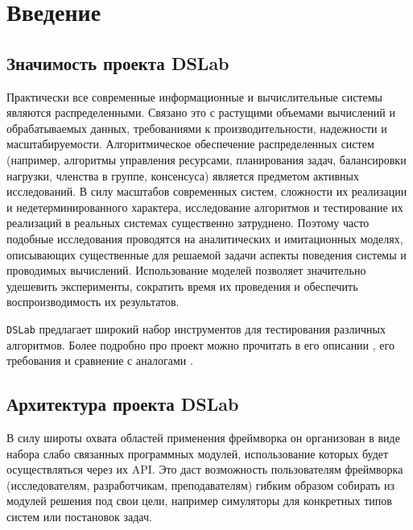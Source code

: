 \newpage

\section{Введение}

\subsection{Значимость проекта DSLab}

Практически все современные информационные и вычислительные системы являются распределенными. Связано это с растущими объемами вычислений и обрабатываемых данных, требованиями к производительности, надежности и масштабируемости. Алгоритмическое обеспечение распределенных систем (например, алгоритмы управления ресурсами, планирования задач, балансировки нагрузки, членства в группе, консенсуса) является предметом активных исследований. В силу масштабов современных систем, сложности их реализации и недетерминированного характера, исследование алгоритмов и тестирование их реализаций в реальных системах существенно затруднено. Поэтому часто подобные исследования проводятся на аналитических и имитационных моделях, описывающих существенные для решаемой задачи аспекты поведения системы и проводимых вычислений. Использование моделей позволяет значительно удешевить эксперименты, сократить время их проведения и обеспечить воспроизводимость их результатов.

\texttt{DSLab}\cite{dslab-repo} предлагает широкий набор инструментов для тестирования различных алгоритмов. Более подробно про проект можно прочитать в его описании \cite{dslab-description}, его требования \cite{dslab-requirements} и сравнение с аналогами \cite{dslab-analog-cmp}.

\subsection{Архитектура проекта DSLab}

В силу широты охвата областей применения фреймворка он организован в виде набора слабо связанных программных модулей, использование которых будет осуществляться через их API. Это даст возможность пользователям фреймворка (исследователям, разработчикам, преподавателям) гибким образом собирать из модулей решения под свои цели, например симуляторы для конкретных типов систем или постановок задач.

